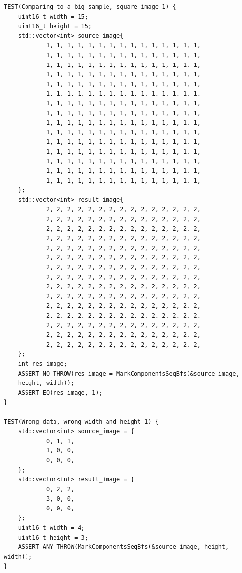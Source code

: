 \documentclass{report}
\begin{document}
\begin{lstlisting}
TEST(Comparing_to_a_big_sample, square_image_1) {
    uint16_t width = 15;
    uint16_t height = 15;
    std::vector<int> source_image{
            1, 1, 1, 1, 1, 1, 1, 1, 1, 1, 1, 1, 1, 1, 1,
            1, 1, 1, 1, 1, 1, 1, 1, 1, 1, 1, 1, 1, 1, 1,
            1, 1, 1, 1, 1, 1, 1, 1, 1, 1, 1, 1, 1, 1, 1,
            1, 1, 1, 1, 1, 1, 1, 1, 1, 1, 1, 1, 1, 1, 1,
            1, 1, 1, 1, 1, 1, 1, 1, 1, 1, 1, 1, 1, 1, 1,
            1, 1, 1, 1, 1, 1, 1, 1, 1, 1, 1, 1, 1, 1, 1,
            1, 1, 1, 1, 1, 1, 1, 1, 1, 1, 1, 1, 1, 1, 1,
            1, 1, 1, 1, 1, 1, 1, 1, 1, 1, 1, 1, 1, 1, 1,
            1, 1, 1, 1, 1, 1, 1, 1, 1, 1, 1, 1, 1, 1, 1,
            1, 1, 1, 1, 1, 1, 1, 1, 1, 1, 1, 1, 1, 1, 1,
            1, 1, 1, 1, 1, 1, 1, 1, 1, 1, 1, 1, 1, 1, 1,
            1, 1, 1, 1, 1, 1, 1, 1, 1, 1, 1, 1, 1, 1, 1,
            1, 1, 1, 1, 1, 1, 1, 1, 1, 1, 1, 1, 1, 1, 1,
            1, 1, 1, 1, 1, 1, 1, 1, 1, 1, 1, 1, 1, 1, 1,
            1, 1, 1, 1, 1, 1, 1, 1, 1, 1, 1, 1, 1, 1, 1,
    };
    std::vector<int> result_image{
            2, 2, 2, 2, 2, 2, 2, 2, 2, 2, 2, 2, 2, 2, 2,
            2, 2, 2, 2, 2, 2, 2, 2, 2, 2, 2, 2, 2, 2, 2,
            2, 2, 2, 2, 2, 2, 2, 2, 2, 2, 2, 2, 2, 2, 2,
            2, 2, 2, 2, 2, 2, 2, 2, 2, 2, 2, 2, 2, 2, 2,
            2, 2, 2, 2, 2, 2, 2, 2, 2, 2, 2, 2, 2, 2, 2,
            2, 2, 2, 2, 2, 2, 2, 2, 2, 2, 2, 2, 2, 2, 2,
            2, 2, 2, 2, 2, 2, 2, 2, 2, 2, 2, 2, 2, 2, 2,
            2, 2, 2, 2, 2, 2, 2, 2, 2, 2, 2, 2, 2, 2, 2,
            2, 2, 2, 2, 2, 2, 2, 2, 2, 2, 2, 2, 2, 2, 2,
            2, 2, 2, 2, 2, 2, 2, 2, 2, 2, 2, 2, 2, 2, 2,
            2, 2, 2, 2, 2, 2, 2, 2, 2, 2, 2, 2, 2, 2, 2,
            2, 2, 2, 2, 2, 2, 2, 2, 2, 2, 2, 2, 2, 2, 2,
            2, 2, 2, 2, 2, 2, 2, 2, 2, 2, 2, 2, 2, 2, 2,
            2, 2, 2, 2, 2, 2, 2, 2, 2, 2, 2, 2, 2, 2, 2,
            2, 2, 2, 2, 2, 2, 2, 2, 2, 2, 2, 2, 2, 2, 2,
    };
    int res_image;
    ASSERT_NO_THROW(res_image = MarkComponentsSeqBfs(&source_image,
    height, width));
    ASSERT_EQ(res_image, 1);
}

TEST(Wrong_data, wrong_width_and_height_1) {
    std::vector<int> source_image = {
            0, 1, 1,
            1, 0, 0,
            0, 0, 0,
    };
    std::vector<int> result_image = {
            0, 2, 2,
            3, 0, 0,
            0, 0, 0,
    };
    uint16_t width = 4;
    uint16_t height = 3;
    ASSERT_ANY_THROW(MarkComponentsSeqBfs(&source_image, height, width));
}


\end{lstlisting}
\end{document}
